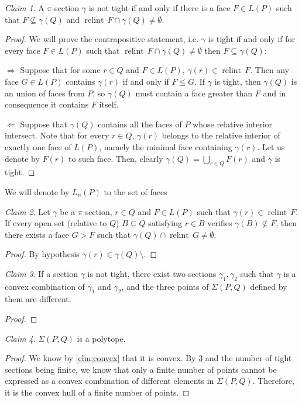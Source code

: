 \documentclass[10pt,a4paper]{article}
\DeclareMathOperator{\relint}{relint}
\theoremstyle{plain}
\theoremstyle{remark}
\newtheorem{claim}{Claim}
\theoremstyle{definition}
\begin{document}
\begin{claim} A $\pi$-section $\gamma$ is not tight if and only if there is a face $F\in L(P)$ such that $F\nsubseteq \gamma(Q)$ and $\relint \, F \cap \gamma(Q)\neq \emptyset$.
\end{claim}
\begin{proof} 
	We will prove the contrapositive statement, i.e.
	$\gamma$ is tight if and only if for every face $F\in L(P)$ such that 
	$\relint \, F \cap \gamma(Q)\neq \emptyset$ 
	then $F\subseteq \gamma(Q)$: \par
	$\boxed{\Rightarrow}$ 
	Suppose that for some $r\in Q$ and $F\in L(P)$, 
	$\gamma(r) \in \relint \,F$.
	Then any face $G\in L(P)$ contains $\gamma(r)$ if and only if $F\leq G$. 
	If $\gamma$ is tight, then $\gamma(Q)$ is an union of faces from $P$, 
	so $\gamma(Q)$ must contain a face greater than $F$ 
	and in consequence it contains $F$ itself. \par
	$\boxed{\Leftarrow}$ 
	Suppose that $\gamma(Q)$ contains all the faces of $P$ whose relative interior intersect. 
	Note that for every $r\in Q$, 
	$\gamma(r)$ belongs to the relative interior of exactly one face of $L(P)$, 
	namely the minimal face containing $\gamma(r)$.
	Let us denote by $F(r)$ to such face. 
	Then, clearly $\gamma(Q)=\bigcup_{r\in Q} F(r)$ and $\gamma$ is tight. 
\end{proof}

We will denote by $L_n(P)$ to the set of faces

\begin{claim} Let $\gamma$ be a $\pi$-section, $r\in Q$ and $F\in L(P)$ such that $\gamma(r) \in  \relint\, F$. If every open set (relative to $Q$) $B\subseteq Q$ satisfying $r\in B$ verifies $\gamma(B)\nsubseteq F$, then there exists a face $G > F$ such that $\gamma(Q)\cap \relint\, G \neq \emptyset$.
\end{claim}
\begin{proof} By hypothesis $\gamma(r)\in \gamma(Q)\setminus$.
\end{proof}

\begin{claim}\label{cl:convexCombSections}
	If a section $\gamma$ is not tight, there exist two sections
	$\gamma_1,\gamma_2$ such that $\gamma$ is a convex combination of 
	$\gamma_1$ and $\gamma_2$, 
	and the three points of $\Sigma(P,Q)$
	defined by them are different. 
\end{claim}
\begin{proof}
\end{proof}
\begin{claim}
	$\Sigma(P,Q)$ is a polytope.
\end{claim}
\begin{proof}
	We know by \cref{clm:convex} that it is convex.
	By \cref{cl:convexCombSections} and the number of tight sections being finite,
	we know that only a finite number of points cannot be expressed as a convex 
	combination of different elements in $\Sigma(P,Q)$.
	Therefore, it is the convex hull of a finite number of points.
\end{proof}
\end{document}
